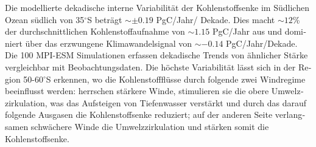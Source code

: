 \begin{otherlanguage}{ngerman}
Die modellierte dekadische interne Variabilität der Kohlenstoffsenke im Südlichen Ozean südlich von 35$^\circ$S beträgt $\sim\pm0.19$ PgC/Jahr/ Dekade. Dies macht $\sim12$\% der durchschnittlichen Kohlenstoffaufnahme von $\sim1.15$ PgC/Jahr aus und dominiert über das erzwungene Klimawandelsignal von $\sim -0.14$ PgC/Jahr/Dekade. Die 100 MPI-ESM Simulationen erfassen dekadische Trends von ähnlicher Stärke vergleichbar mit Beobachtungsdaten. Die höchste Variabilität lässt sich in der Region 50-60$^\circ$S erkennen, wo die Kohlenstoffflüsse durch folgende zwei Windregime beeinflusst werden: herrschen stärkere Winde, stimulieren sie die obere Umwelzzirkulation, was das Aufsteigen von Tiefenwasser verstärkt und durch das darauf folgende Ausgasen die Kohlenstoffsenke reduziert; auf der anderen Seite verlangsamen schwächere Winde die Umwelzzirkulation und stärken somit die Kohlenstoffsenke.

\end{otherlanguage}


